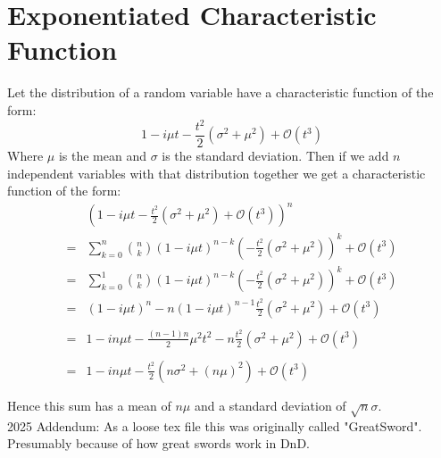 
\section{Exponentiated Characteristic Function}
Let the distribution of a random variable have a characteristic function of the form:
\[1-i\mu t-\frac{t^2}{2}(\sigma^2+\mu^2)+\mathcal{O}(t^3) \]
Where $\mu$ is the mean and $\sigma$ is the standard deviation.
Then if we add $n$ independent variables with that distribution together we get a characteristic function of the form:
\begin{equation*}
\begin{aligned}
	&\left(1-i\mu t-\frac{t^2}{2}(\sigma^2+\mu^2)+\mathcal{O}(t^3)\right)^n \\
	=& \sum_{k=0}^n\binom{n}{k}(1-i\mu t)^{n-k} \left(-\frac{t^2}{2}(\sigma^2+\mu^2)\right)^k +\mathcal{O}(t^3)\\
	=& \sum_{k=0}^1\binom{n}{k}(1-i\mu t)^{n-k} \left(-\frac{t^2}{2}(\sigma^2+\mu^2)\right)^k + \mathcal{O}(t^3)\\
	=&(1-i\mu t)^n-n(1-i\mu t)^{n-1}\frac{t^2}{2}(\sigma^2+\mu^2)+ \mathcal{O}(t^3)\\\\
	=&1-in\mu t - \frac{(n-1)n}{2}\mu^2 t^2 -n\frac{t^2}{2}(\sigma^2+\mu^2)+ \mathcal{O}(t^3)\\\\
	=&1-in\mu t  -\frac{t^2}{2}(n\sigma^2+(n\mu)^2)+ \mathcal{O}(t^3)\\\\
\end{aligned}
\end{equation*}
Hence this sum has a mean of $n\mu$ and a standard deviation of $\sqrt{n}\sigma$.
\\

2025 Addendum: As a loose tex file this was originally called "GreatSword".
Presumably because of how great swords work in DnD.
